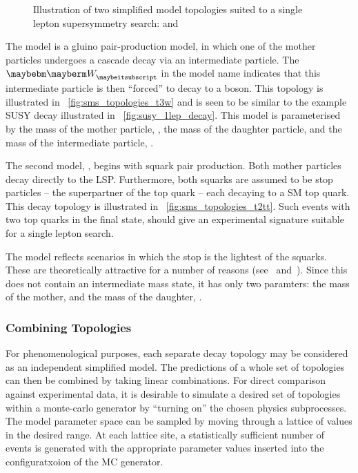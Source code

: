 \begin{figure}[h!]
\centering
{}\quad
{}
\caption[Illustration of two simplified model topologies suited to a single
lepton supersymmetry search]{Illustration of two simplified model topologies
  suited to a single lepton supersymmetry search:
   \TthreeW and 
  \Ttwott~\cite{susy_interpretation_pas}}
\label{fig:sms_topologies}
\end{figure}

The \TthreeW model is a gluino pair-production model, in which one of the mother
particles undergoes a cascade decay via an intermediate particle. The $\PW$ in
the model name indicates that this intermediate particle is then ``forced'' to
decay to a \PW boson. This topology is illustrated in
\fig~\ref{fig:sms_topologies_t3w} and is seen to be similar to the example
\ac{SUSY} decay illustrated in \fig~\ref{fig:susy_1lep_decay}. This model is
parameterised by the mass of the mother particle, \Mgluino, the mass of the
daughter particle, \Mlsp and the mass of the intermediate particle, \Mchargino.

The second model, \Ttwott, begins with squark pair production. Both mother
particles decay directly to the \ac{LSP}. Furthermore, both squarks are assumed
to be stop particles -- the superpartner of the top quark -- each decaying to a
\ac{SM} top quark. This decay topology is illustrated in
\fig~\ref{fig:sms_topologies_t2tt}. Such events with two top quarks in the final
state, should give an experimental signature suitable for a single lepton
search.

The \Ttwott model reflects scenarios in which the stop is the lightest of the
squarks. These are theoretically attractive for a number of reasons
(see~\cite[{p.~202}]{sparticles} and~\cite{light_stop}). Since this does not
contain an intermediate mass state, it has only two paramters: the mass of the
mother, \Mstop and the mass of the daughter, \Mlsp.

\subsubsection{Combining Topologies}
For phenomenological purposes, each separate decay topology may be considered as
an independent simplified model. The predictions of a whole set of topologies
can then be combined by taking linear combinations. For direct comparison
against experimental data, it is desirable to simulate a desired set of
topologies within a monte-carlo generator by ``turning on'' the chosen physics
subprocesses. The model parameter space can be sampled by moving through a
lattice of values in the desired range. At each lattice site, a statistically
sufficient number of events is generated with the appropriate parameter values
inserted into the configuratxoion of the \ac{MC} generator.